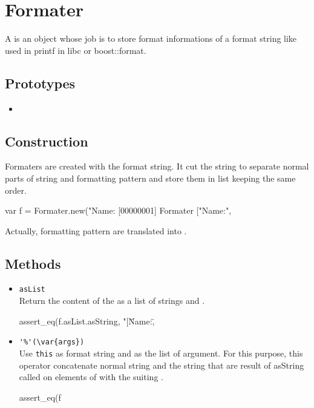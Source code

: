 \section{Formater}

A  is an object whose job is to store format
informations of a format string like used in printf in libc or
boost::format.

\subsection{Prototypes}

\begin{itemize}
\item {}
\end{itemize}

\subsection{Construction}

Formaters are created with the format string. It cut the string to
separate normal parts of string and formatting pattern and store them
in list keeping the same order.

\begin{urbiscript}
var f = Formater.new("Name:%
[00000001] Formater ["Name:", %
\end{urbiscript}

Actually, formatting pattern are translated into
.

\subsection{Methods}

\begin{itemize}
\item \lstinline|asList|\\
  Return the content of the  as a list of strings and
  .
\begin{urbiscript}[firstnumber=last]
assert_eq(f.asList.asString, "[\"Name:\", %
\end{urbiscript}

\item \lstinline|'%'(\var{args})|\\
  Use \lstinline|this| as format string and  as the list of
  argument. For this purpose, this operator concatenate normal string
  and the string that are result of asString called on elements of
   with the suiting .
\begin{urbiscript}[firstnumber=last]
assert_eq(f %
\end{urbiscript}

\end{itemize}
